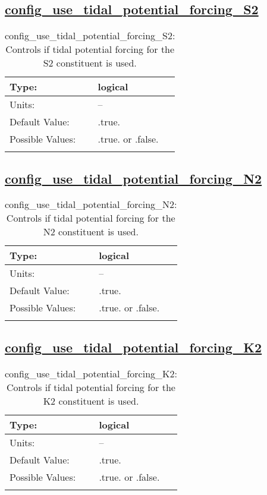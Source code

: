 \subsection[config\_use\_tidal\_potential\_forcing\_S2]{\hyperref[sec:nm_tab_tidal_potential_forcing]{config\_use\_tidal\_potential\_forcing\_S2}}
\label{subsec:nm_sec_config_use_tidal_potential_forcing_S2}
\begin{center}
\begin{longtable}{| p{2.0in} || p{4.0in} |}
    \hline
    Type: & logical \\
    \hline
    Units: & -- \\
    \hline
    Default Value: & .true. \\
    \hline
    Possible Values: & .true. or .false. \\
    \hline
    \caption{config\_use\_tidal\_potential\_forcing\_S2: Controls if tidal potential forcing for the S2 constituent is used.}
\end{longtable}
\end{center}
\subsection[config\_use\_tidal\_potential\_forcing\_N2]{\hyperref[sec:nm_tab_tidal_potential_forcing]{config\_use\_tidal\_potential\_forcing\_N2}}
\label{subsec:nm_sec_config_use_tidal_potential_forcing_N2}
\begin{center}
\begin{longtable}{| p{2.0in} || p{4.0in} |}
    \hline
    Type: & logical \\
    \hline
    Units: & -- \\
    \hline
    Default Value: & .true. \\
    \hline
    Possible Values: & .true. or .false. \\
    \hline
    \caption{config\_use\_tidal\_potential\_forcing\_N2: Controls if tidal potential forcing for the N2 constituent is used.}
\end{longtable}
\end{center}
\subsection[config\_use\_tidal\_potential\_forcing\_K2]{\hyperref[sec:nm_tab_tidal_potential_forcing]{config\_use\_tidal\_potential\_forcing\_K2}}
\label{subsec:nm_sec_config_use_tidal_potential_forcing_K2}
\begin{center}
\begin{longtable}{| p{2.0in} || p{4.0in} |}
    \hline
    Type: & logical \\
    \hline
    Units: & -- \\
    \hline
    Default Value: & .true. \\
    \hline
    Possible Values: & .true. or .false. \\
    \hline
    \caption{config\_use\_tidal\_potential\_forcing\_K2: Controls if tidal potential forcing for the K2 constituent is used.}
\end{longtable}
\end{center}
